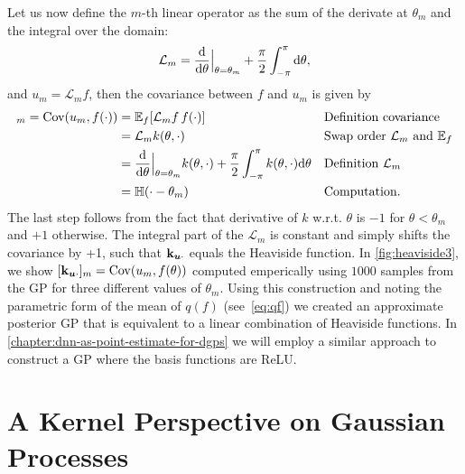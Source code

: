 Let us now define the $m$-th linear operator as the sum of the derivate at $\theta_m$ and the integral over the domain:
\begin{equation}
  \mathcal{L}_m = \frac{\mathrm{d}{}}{\mathrm{d}{\theta}}\Bigr|_{\theta = \theta_m} + \frac{\pi}{2} \int_{-\pi}^{\pi} \mathrm{d}{\theta},
\end{equation}
and $u_m = \mathcal{L}_m f$, then the covariance between $f$ and $u_m$ is given by
\begin{align}
  [\kux]_m = \Cov(u_m, f(\cdot)) &= \Exp{f}{\mathcal{L}_m f\,f(\cdot)} && \text{Definition covariance} \\
                      &=  \mathcal{L}_m k(\theta, \cdot)  && \text{Swap order $\mathcal{L}_m$ and $\mathbb{E}_f$} \\
                      &= \frac{\calcd{}}{\calcd{\theta}}\Bigr|_{\theta = \theta_m} k(\theta, \cdot) + \frac{\pi}{2} \int_{-\pi}^\pi k(\theta, \cdot) \calcd{\theta} && \text{Definition $\mathcal{L}_m$} \\
                      &= \mathbb{H}(\cdot - \theta_m) && \text{Computation}.
\end{align}
The last step follows from the fact that derivative of $k$ w.r.t. $\theta$ is $-1$ for $\theta < \theta_m$ and $+1$ otherwise. The integral part of the $\mathcal{L}_m$ is constant and simply shifts the covariance by +1, such that $\mathbf{k}_{\bm{u} \cdot}$ equals the Heaviside function. In \cref{fig:heaviside3}, we show $[\mathbf{k}_{\bm{u} \cdot}]_m = \mathrm{Cov}(u_m, f(\theta))$ computed emperically using $1000$ samples from the GP for three different values of $\theta_m$. Using this construction and noting the parametric form of the mean of $q(f)$ (see~\cref{eq:qf}) we created an approximate posterior GP that is equivalent to a linear combination of Heaviside functions. In \cref{chapter:dnn-as-point-estimate-for-dgps} we will employ a similar approach to construct a GP where the basis functions are ReLU.



\section{A Kernel Perspective on Gaussian Processes}

